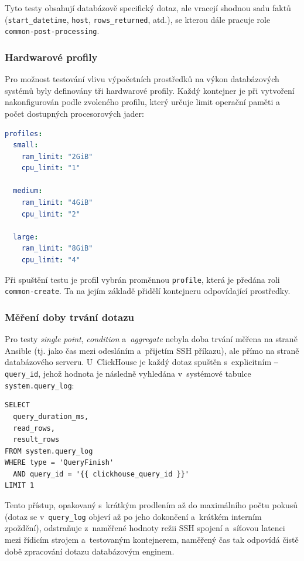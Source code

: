 Tyto testy obsahují databázově specifický dotaz, ale vracejí shodnou sadu faktů (\texttt{start\_datetime}, \texttt{host}, \texttt{rows\_returned}, atd.), se kterou dále pracuje role \texttt{common-post-processing}.

\subsubsection{Hardwarové profily}

Pro možnost testování vlivu výpočetních prostředků na výkon databázových systémů byly definovány tři hardwarové profily. Každý kontejner je při vytvoření nakonfigurován podle zvoleného profilu, který určuje limit operační paměti a počet dostupných procesorových jader:

\begin{lstlisting}[language=YAML, caption={Definice hardwarových profilů}, label={lst:profiles}, captionpos=b]
profiles:
  small:
    ram_limit: "2GiB"
    cpu_limit: "1"

  medium:
    ram_limit: "4GiB"
    cpu_limit: "2"

  large:
    ram_limit: "8GiB"
    cpu_limit: "4"
\end{lstlisting}

Při spuštění testu je profil vybrán proměnnou \texttt{profile}, která je předána roli \texttt{common-create}. Ta na jejím základě přidělí kontejneru odpovídající prostředky.

\subsubsection{Měření doby trvání dotazu}
Pro testy \textit{single point}, \textit{condition} a~\textit{aggregate} nebyla doba trvání měřena na straně Ansible (tj. jako čas mezi odesláním a~přijetím SSH příkazu), ale přímo na straně databázového serveru. 
U~ClickHouse je každý dotaz spuštěn s~explicitním \texttt{--query\_id}, jehož hodnota je následně vyhledána v~systémové tabulce \texttt{system.query\_log}:

\begin{lstlisting}[caption={Výřez z~tests/clickhousedb/helper/get\_query\_timing.yml}, label={lst:getquerytiming}, captionpos=b]
SELECT
  query_duration_ms,
  read_rows,
  result_rows
FROM system.query_log
WHERE type = 'QueryFinish'
  AND query_id = '{{ clickhouse_query_id }}'
LIMIT 1
\end{lstlisting}

Tento přístup, opakovaný s~krátkým prodlením až do maximálního počtu pokusů (dotaz se v~\texttt{query\_log} objeví až po jeho dokončení a~krátkém interním zpoždění), odstraňuje z~naměřené hodnoty režii SSH spojení a~síťovou latenci mezi řídicím strojem a~testovaným kontejnerem, naměřený čas tak odpovídá čistě době zpracování dotazu databázovým enginem.

